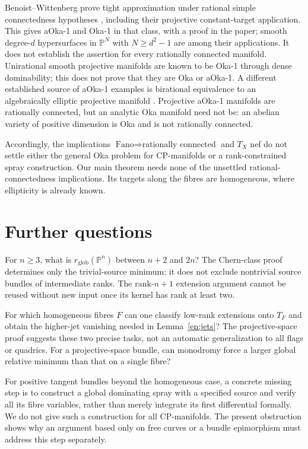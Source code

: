 \documentclass[12pt]{amsart}
\theoremstyle{definition}
\theoremstyle{remark}
\numberwithin{equation}{section}
\newcommand{\mP}{\mathbb{P}}
\begin{document}
Benoist--Wittenberg prove tight approximation under rational simple connectedness hypotheses \cite{en:BW}, including their projective constant-target application. This gives aOka-1 and Oka-1 in that class, with a proof in the paper; smooth degree-$d$ hypersurfaces in $\mP^N$ with $N\geq d^2-1$ are among their applications. It does not establish the assertion for every rationally connected manifold. Unirational smooth projective manifolds are known to be Oka-1 through dense dominability; this does not prove that they are Oka or aOka-1. A different established source of aOka-1 examples is birational equivalence to an algebraically elliptic projective manifold \cite[Theorem~1.6 and Remark~1.10]{en:FLone}. Projective aOka-1 manifolds are rationally connected, but an analytic Oka manifold need not be: an abelian variety of positive dimension is Oka and is not rationally connected.

Accordingly, the implications $\text{Fano}\Rightarrow\text{rationally connected}$ and $T_X$ nef do not settle either the general Oka problem for CP-manifolds or a rank-constrained spray construction. Our main theorem needs none of the unsettled rational-connectedness implications. Its targets along the fibres are homogeneous, where ellipticity is already known.

\section{Further questions}
For $n\geq3$, what is $r_{\mathrm{glob}}(\mP^n)$ between $n+2$ and $2n$? The Chern-class proof determines only the trivial-source minimum; it does not exclude nontrivial source bundles of intermediate ranks. The rank-$n+1$ extension argument cannot be reused without new input once its kernel has rank at least two.

For which homogeneous fibres $F$ can one classify low-rank extensions onto $T_F$ and obtain the higher-jet vanishing needed in Lemma~\ref{en:jets}? The projective-space proof suggests these two precise tasks, not an automatic generalization to all flags or quadrics. For a projective-space bundle, can monodromy force a larger global relative minimum than that on a single fibre?

For positive tangent bundles beyond the homogeneous case, a concrete missing step is to construct a global dominating spray with a specified source and verify all its fibre variables, rather than merely integrate its first differential formally. We do not give such a construction for all CP-manifolds. The present obstruction shows why an argument based only on free curves or a bundle epimorphism must address this step separately.
\end{document}

